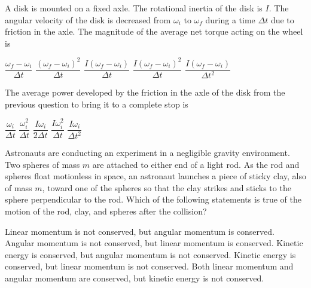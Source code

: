 \documentclass{../../oss-apphys-exam}
\begin{document}
\begin{multicols*}{2}
\begin{questions}
    \question A disk is mounted on a fixed axle. The rotational inertia of the
    disk is $I$. The angular velocity of the disk is decreased from $\omega_i$
    to $\omega_f$ during a time $\Delta t$ due to friction in the axle. The
    magnitude of the average net torque acting on the wheel is
    \begin{choices}
      \choice $\dfrac{\omega_f-\omega_i}{\Delta t}$
      \choice $\dfrac{(\omega_f-\omega_i)^2}{\Delta t}$
      \choice $\dfrac{I(\omega_f-\omega_i)}{\Delta t}$
      \choice $\dfrac{I(\omega_f-\omega_i)^2}{\Delta t}$
      \choice $\dfrac{I(\omega_f-\omega_i)}{\Delta t^2}$
    \end{choices}
    
  \question The average power developed by the friction in the axle of the disk
    from the previous question to bring it to a complete stop is
    \begin{choices}
      \choice $\dfrac{\omega_i}{\Delta t}$
      \choice $\dfrac{\omega_i^2}{\Delta t}$
      \choice $\dfrac{I\omega_i}{2\Delta t}$
      \choice $\dfrac{I\omega_i^2}{\Delta t}$
      \choice $\dfrac{I\omega_i}{\Delta t^2}$
    \end{choices}    
    \columnbreak
    
    \question Astronauts are conducting an experiment in a negligible gravity
    environment. Two spheres of mass $m$ are attached to either end of a light
    rod. As the rod and spheres float motionless in space, an astronaut
    launches a piece of sticky clay, also of mass $m$, toward one of the spheres
    so that the clay strikes and sticks to the sphere perpendicular to the rod.
    Which of the following statements is true of the motion of the rod, clay,
    and spheres after the collision?
    \begin{center}
    \end{center}
    \begin{choices}
      \choice Linear momentum is not conserved, but angular momentum is
      conserved.
      \choice Angular momentum is not conserved, but linear momentum is
      conserved.
      \choice Kinetic energy is conserved, but angular momentum is not
      conserved.
      \choice Kinetic energy is conserved, but linear momentum is not conserved.
      \choice Both linear momentum and angular momentum are conserved, but
      kinetic energy is not conserved.
    \end{choices}
    \vspace{.7in}
      

\end{questions}
\end{multicols*}
\end{document}
